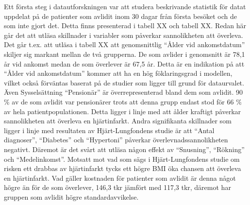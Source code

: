 Ett första steg i datautforskningen var att studera beskrivande statistik för datat uppdelat på de patienter som avlidit inom 30 dagar från första besöket och de som inte gjort det. Detta finns presenterad i tabell XX och tabell XX. Redan här går det att utläsa skillnader i variabler som påverkar sannolikheten att överleva. Det går t.ex. att utläsa i tabell XX att genomsnittlig “Ålder vid ankomstdatum” skiljer sig markant mellan de två grupperna. De som avlider i genomsnitt är 78,1 år vid ankomst medan de som överlever är 67,5 år. Detta är en indikation på att “Ålder vid ankomstdatum” kommer att ha en hög föklaringsgrad i modellen, vilket också förväntas baserat på de studier som ligger till grund för dataurvalet. Även Sysselsättning “Pensionär” är överrepresenterad bland dem som avlidit. 90 \% av de som avlidit var pensionärer trots att denna grupp endast stod för 66 \% av hela patientpopulationen. Detta ligger i linje med att ålder kraftigt påverkar sannolikheten att överleva en hjärtinfarkt. Andra signifikanta skillnader som ligger i linje med resultaten av Hjärt-Lungfondens studie är att “Antal diagnoser”, “Diabetes” och “Hypertoni” påverkar överlevnadssannolikheten negativt. Däremot är det svårt att utläsa någon effekt av “Snusning”, “Rökning” och “Medelinkomst”. Motsatt mot vad som sägs i Hjärt-Lungfondens studie om risken ett drabbas av hjärtinfarkt tycks ett högre BMI öka chansen att överleva en hjärtinfarkt. Vad gäller kostnaden för patienter som avlidit är denna något högre än för de som överlever, 146,3 tkr jämfört med 117,3 tkr, däremot har gruppen som avlidit högre standardavvikelse.

